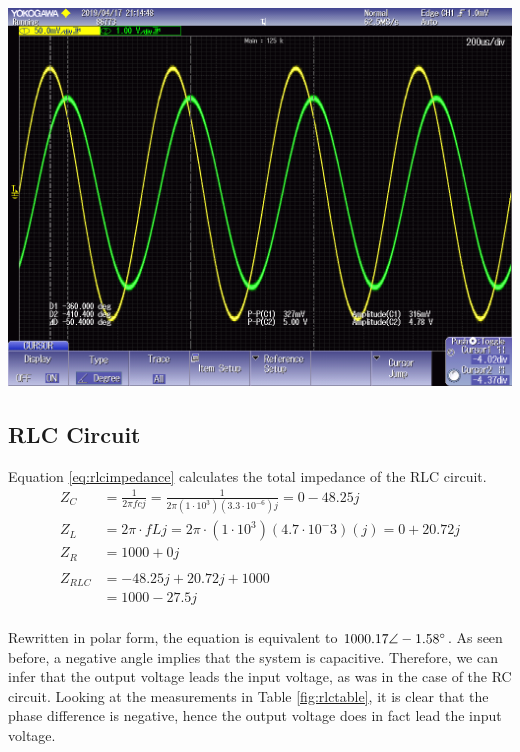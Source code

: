 \documentclass[journal]{IEEEtran}
\begin{document}
\begingroup
    \centering
    \medskip
    \includegraphics[width=\columnwidth]{images/lab8_017.png}
    \label{fig:rlosc2}
    \medskip
\endgroup


\subsection{RLC Circuit}
Equation \ref{eq:rlcimpedance} calculates the total impedance of the RLC circuit.\\


\begin{equation}
    \begin{split}
        Z_{C} & = \frac{1}{2\pi fcj} = \frac{1}{2\pi(1\cdot10^3)(3.3\cdot10^{-6})j} = 0 - 48.25j \\ 
        Z_{L} & = 2\pi\cdot fLj = 2\pi \cdot (1\cdot10^3)(4.7\cdot10^-3)(j) = 0 + 20.72j \\
        Z_{R} & = 1000 + 0j \\ 
        \\
        Z_{RLC} & = -48.25j + 20.72j + 1000\\
                & = 1000 - 27.5j
    \end{split}
    \label{eq:rlcimpedance}
\end{equation} \\

\noindent Rewritten in polar form, the equation is equivalent to $1000.17 \angle-1.58\degree$. As seen before, a negative angle implies that the system is capacitive. Therefore, we can infer that the output voltage leads the input voltage, as was in the case of the RC circuit. Looking at the measurements in Table \ref{fig:rlctable}, it is clear that the phase difference is negative, hence the output voltage does in fact lead the input voltage. 
\end{document}
